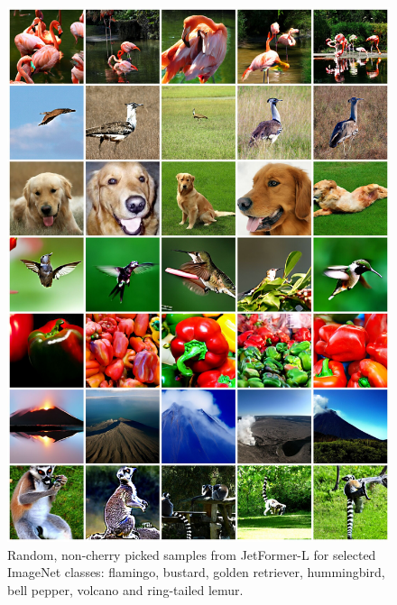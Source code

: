 \documentclass{article} %
\newcommand{\name}{JetFormer\xspace}
\begin{document}
\begin{figure}[h]
    \centering
    \includegraphics[width=1.0\textwidth]{figures/random-samples-classes.jpg}
    \caption{Random, non-cherry picked samples from \name-L for selected ImageNet classes: flamingo, bustard, golden retriever, hummingbird, bell pepper, volcano and ring-tailed lemur.}
\end{figure}
\end{document}

